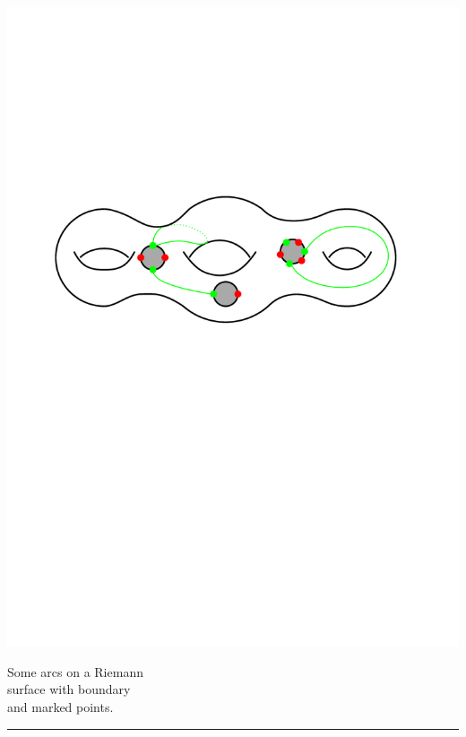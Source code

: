 \documentclass[portrait,final,a0paper,fontscale=0.25]{baposter}
\theoremstyle{definition}
\begin{document}
\begin{poster}
{%
\vspace*{-.1cm}
\includegraphics[scale=.38]{Surface}

\vspace*{-1.7cm}\hspace*{6.4cm}
\begin{minipage}{4cm}
{\footnotesize Some arcs on a Riemann \\ surface with boundary \\ and marked points.}
\end{minipage}

\vspace{.6cm}
\hspace{-.25cm}
{\color{blue} \rule{10.02cm}{1pt}}
\vspace{-.35cm}

}
\end{poster}
\end{document}

